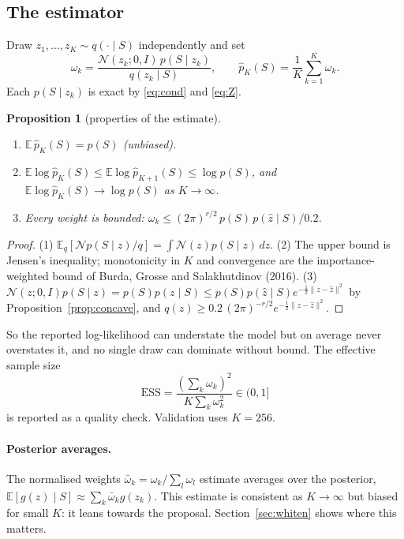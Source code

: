 \documentclass[11pt,a4paper]{article}
\newtheorem{proposition}{Proposition}
\theoremstyle{remark}
\newcommand{\N}{\mathcal N}
\newcommand{\E}{\mathbb E}
\begin{document}
\subsection{The estimator}

Draw $z_1,\dots,z_K\sim q(\cdot\mid S)$ independently and set
\begin{equation}
\omega_k=\frac{\N(z_k;0,I)\,p(S\mid z_k)}{q(z_k\mid S)},\qquad
\hat p_K(S)=\frac1K\sum_{k=1}^K\omega_k .
\label{eq:is}
\end{equation}
Each $p(S\mid z_k)$ is exact by \eqref{eq:cond} and \eqref{eq:Z}.

\begin{proposition}[properties of the estimate]\label{prop:is}
\begin{enumerate}
\item $\E\,\hat p_K(S)=p(S)$ (unbiased).
\item $\E\log\hat p_K(S)\le\E\log\hat p_{K+1}(S)\le\log p(S)$, and $\E\log\hat p_K(S)\to\log p(S)$ as $K\to\infty$.
\item Every weight is bounded: $\omega_k\le(2\pi)^{r/2}\,p(S)\,p(\hat z\mid S)/0.2$.
\end{enumerate}
\end{proposition}
\begin{proof}
(1) $\E_q[\N p(S\mid z)/q]=\int\N(z)p(S\mid z)\,dz$. (2) The upper bound is Jensen's inequality; monotonicity
in $K$ and convergence are the importance-weighted bound of Burda, Grosse and Salakhutdinov (2016).
(3) $\N(z;0,I)p(S\mid z)=p(S)p(z\mid S)\le p(S)p(\hat z\mid S)e^{-\frac12\lVert z-\hat z\rVert^2}$ by Proposition~\ref{prop:concave}, and
$q(z)\ge0.2\,(2\pi)^{-r/2}e^{-\frac12\lVert z-\hat z\rVert^2}$.
\end{proof}
So the reported log-likelihood can understate the model but on average never overstates it, and no single
draw can dominate without bound. The effective sample size
\[
\mathrm{ESS}=\frac{(\sum_k\omega_k)^2}{K\sum_k\omega_k^2}\in(0,1]
\]
is reported as a quality check. Validation uses $K=256$.

\paragraph{Posterior averages.} The normalised weights $\bar\omega_k=\omega_k/\sum_l\omega_l$ estimate
averages over the posterior, $\E[g(z)\mid S]\approx\sum_k\bar\omega_kg(z_k)$. This estimate is consistent as
$K\to\infty$ but biased for small $K$: it leans towards the proposal. Section~\ref{sec:whiten} shows where
this matters.
\end{document}
